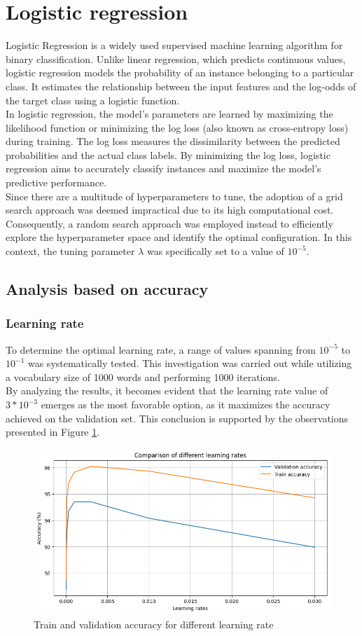 \documentclass{class}
\begin{document}
\section{Logistic regression}
Logistic Regression is a widely used supervised machine learning algorithm for binary classification.
Unlike linear regression, which predicts continuous values, logistic regression models the probability of an instance belonging to a particular class.
It estimates the relationship between the input features and the log-odds of the target class using a logistic function.\\
In logistic regression, the model's parameters are learned by maximizing the likelihood function or minimizing the log loss
(also known as cross-entropy loss) during training.
The log loss measures the dissimilarity between the predicted probabilities and the actual class labels.
By minimizing the log loss, logistic regression aims to accurately classify instances and maximize the model's predictive performance.\\
Since there are a multitude of hyperparameters to tune, the adoption of a grid search approach was deemed impractical due to its high computational cost.
Consequently, a random search approach was employed instead to efficiently explore the hyperparameter space and identify the optimal configuration.
In this context, the tuning parameter $\lambda$ was specifically set to a value of $ 10^{-5}$.

\subsection{Analysis based on accuracy}
\subsubsection*{Learning rate}
To determine the optimal learning rate, a range of values spanning from $10^{-5}$ to $10^{-1}$ was systematically tested.
This investigation was carried out while utilizing a vocabulary size of 1000 words and performing 1000 iterations.\\
By analyzing the results, it becomes evident that the learning rate value of $3*10^{-3}$ emerges as the most favorable option,
as it maximizes the accuracy achieved on the validation set.
This conclusion is supported by the observations presented in Figure \ref{fig-4}.

\begin{figure}[h]
    \centering
    \includegraphics[width=0.7\columnwidth]{images/logreg_lr.png}
    \caption{Train and  validation accuracy for different learning rate}
    \label{fig-4}
\end{figure}
\end{document}
